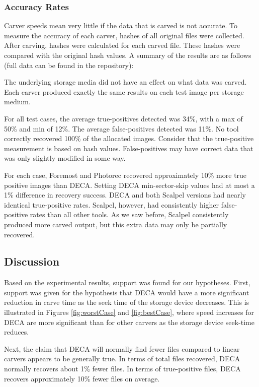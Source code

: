 \documentclass[final,5p,times,twocolumn,authoryear]{elsarticle}
\begin{document}
\subsubsection{Accuracy Rates}
Carver speeds mean very little if the data that is carved is not accurate. To measure the accuracy of each carver, hashes of all original files were collected. After carving, hashes were calculated for each carved file. These hashes were compared with the original hash values. A summary of the results are as follows (full data can be found in the repository):

The underlying storage media did not have an effect on what data was carved. Each carver produced exactly the same results on each test image per storage medium.

For all test cases, the average true-positives detected was 34\%, with a max of 50\% and min of 12\%. The average false-positives detected was 11\%. No tool correctly recovered 100\% of the allocated images. Consider that the true-positive measurement is based on hash values. False-positives may have correct data that was only slightly modified in some way.

For each case, Foremost and Photorec recovered approximately 10\% more true positive images than DECA. Setting DECA min-sector-skip values had at most a 1\% difference in recovery success. DECA and both Scalpel versions had nearly identical true-positive rates. Scalpel, however, had consistently higher false-positive rates than all other tools. As we saw before, Scalpel consistently produced more carved output, but this extra data may only be partially recovered.

\subsection{Discussion}
Based on the experimental results, support was found for our hypotheses. First, support was given for the hypothesis that DECA would have a more significant reduction in carve time as the seek time of the storage device decreases. This is illustrated in Figures \ref{fig:worstCase} and \ref{fig:bestCase}, where speed increases for DECA are more significant than for other carvers as the storage device seek-time reduces.

Next, the claim that DECA will normally find fewer files compared to linear carvers appears to be generally true. In terms of total files recovered, DECA normally recovers about 1\% fewer files. In terms of true-positive files, DECA recovers approximately 10\% fewer files on average.
\end{document}
